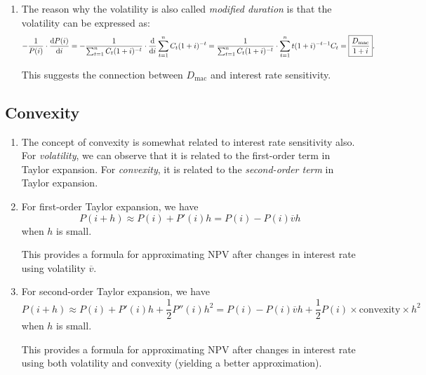 \begin{enumerate}
\item \label{it:mod-dur-mac-dur-relation}
The reason why the volatility is also called \emph{modified duration} is
that the volatility can be expressed as:
\[
-\frac{1}{P(i)}\cdot\dv{P(i)}{i}
=-\frac{1}{\sum_{t=1}^{n}C_t(1+i)^{-t}}\cdot\dv{}{i}\sum_{t=1}^{n}C_t(1+i)^{-t}
=\frac{1}{\sum_{t=1}^{n}C_t(1+i)^{-t}}\cdot\sum_{t=1}^{n}t(1+i)^{-t-1}C_t
=\boxed{\frac{D_{\text{mac}}}{1+i}}.
\]
\begin{note}
This suggests the connection between \(D_{\text{mac}}\) and interest rate
sensitivity.
\end{note}
\end{enumerate}
\subsection{Convexity}
\begin{enumerate}
\item The concept of convexity is somewhat related to interest rate sensitivity
also. For \emph{volatility}, we can observe that it is related to the
first-order term in Taylor expansion. For \emph{convexity}, it is
related to the \emph{second-order term} in Taylor expansion.

\item \label{it:vol-approx-npv-change}
For first-order Taylor expansion, we have
\[P(i+h)\approx P(i)+P'(i)h=\boxed{P(i)-P(i)\overline{v}h}\]
when \(h\) is small.

\begin{note}
This provides a formula for approximating NPV after changes in interest rate
using volatility \(\overline{v}\).
\end{note}

\item \label{it:vol-convexity-approx-npv-change}
For second-order Taylor expansion, we have
\[P(i+h)\approx P(i)+P'(i)h+\frac{1}{2}P''(i)h^2
=\boxed{P(i)-P(i)\overline{v}h+\frac{1}{2}P(i)\times \text{convexity}\times h^2}
\]
when \(h\) is small.

\begin{note}
This provides a formula for approximating NPV after changes in interest rate
using both volatility and convexity (yielding a better approximation).
\end{note}


\end{enumerate}
